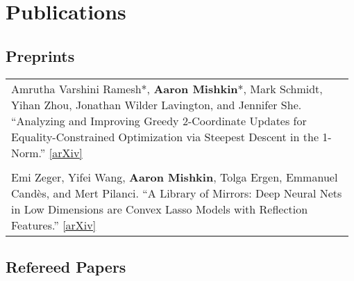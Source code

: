 \documentclass[10pt]{article}
\newcommand{\spacing}{\vspace{0.5cm}}
\begin{document}
\spacing

\section{Publications}

\vspace{1em}

\subsection*{Preprints}

\begin{tabular}{L{0.98\linewidth}}
    Amrutha Varshini Ramesh*, \textbf{Aaron Mishkin}*, Mark Schmidt, Yihan Zhou,
    Jonathan Wilder Lavington, and Jennifer She.
    ``Analyzing and Improving Greedy 2-Coordinate Updates for Equality-Constrained Optimization via Steepest Descent in the 1-Norm.'' \href{https://arxiv.org/abs/2307.01169}{[arXiv]}
    \\  \\
    Emi Zeger, Yifei Wang, \textbf{Aaron Mishkin}, Tolga Ergen, Emmanuel Candès,
    and Mert Pilanci. ``A Library of Mirrors: Deep Neural Nets in Low Dimensions are
    Convex Lasso Models with Reflection Features.'' \href{https://arxiv.org/abs/2403.01046}{[arXiv]} \\
\end{tabular}

\subsection*{Refereed Papers}
\end{document}
